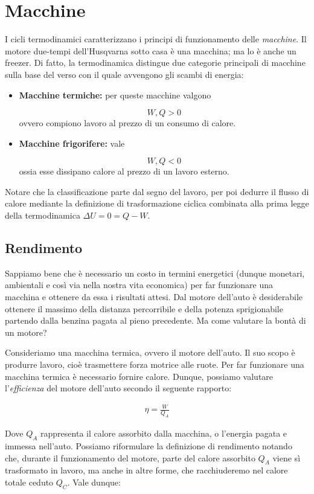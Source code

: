 \newpage
\section*{Macchine}
I cicli termodinamici caratterizzano i principi di funzionamento delle
\textit{macchine}. Il motore due-tempi dell'Husqvarna sotto
casa è una macchina; ma lo è anche un freezer. Di fatto, la termodinamica
distingue due categorie principali di macchine sulla base del verso con il
quale avvengono gli scambi di energia:

\begin{itemize}
    \item \textbf{Macchine termiche:} per queste macchine valgono
    
    \[ W,Q > 0 \]
    ovvero compiono lavoro al prezzo di un consumo di calore.

    \item \textbf{Macchine frigorifere:} vale
    
    \[ W,Q < 0 \]
    ossia esse dissipano calore al prezzo di un lavoro esterno.
\end{itemize}

Notare che la classificazione parte dal segno del lavoro, per poi
dedurre il flusso di calore mediante la definizione di trasformazione
ciclica combinata alla prima legge della termodinamica $\Delta U = 0 = Q - W$.

\subsection*{Rendimento}
Sappiamo bene che è necessario un costo in termini energetici (dunque monetari,
ambientali e così via nella nostra vita economica) per far funzionare una
macchina e ottenere da essa i risultati attesi. Dal motore dell'auto è desiderabile
ottenere il massimo della distanza percorribile e della potenza sprigionabile
partendo dalla benzina pagata al pieno precedente. Ma come valutare la bontà
di un motore?

Consideriamo una macchina termica, ovvero il motore dell'auto. Il suo scopo
è produrre lavoro, cioè trasmettere forza motrice alle ruote. Per far funzionare
una macchina termica è necessario fornire calore. Dunque, possiamo valutare
l'\textit{efficienza} del motore dell'auto secondo il seguente rapporto:

\begin{align}
    \eta = \frac{W}{Q_A}
\end{align}


\noindent Dove $Q_A$ rappresenta il calore assorbito dalla macchina, o l'energia pagata
e immessa nell'auto. Possiamo riformulare la definizione di rendimento
notando che, durante il funzionamento del motore, parte del calore assorbito
$Q_A$ viene sì trasformato in lavoro, ma anche in altre forme, che racchiuderemo
nel calore totale ceduto $Q_C$. Vale dunque:


